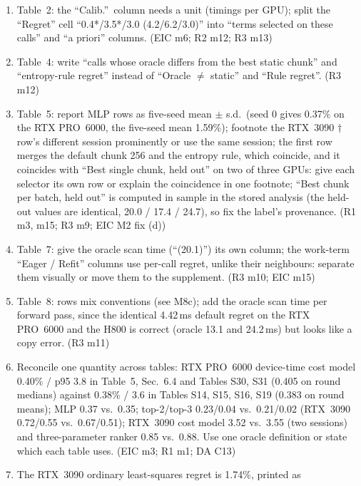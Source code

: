 \documentclass[11pt]{article}
\begin{document}
\begin{enumerate}[label=N\arabic*.]
        overlap the plotted lines. (R3 m8)
  \item Table~2: the ``Calib.''\ column needs a unit (timings per GPU); split
        the ``Regret'' cell ``0.4*/3.5*/3.0 (4.2/6.2/3.0)'' into ``terms
        selected on these calls'' and ``a priori'' columns. (EIC m6; R2 m12;
        R3 m13)
  \item Table~4: write ``calls whose oracle differs from the best static
        chunk'' and ``entropy-rule regret'' instead of ``Oracle $\neq$
        static'' and ``Rule regret''. (R3 m12)
  \item Table~5: report MLP rows as five-seed mean $\pm$ s.d.\ (seed 0 gives
        0.37\% on the RTX PRO~6000, the five-seed mean 1.59\%); footnote the
        RTX~3090 $\dagger$ row's different session prominently or use the
        same session; the first row merges the default chunk 256 and the
        entropy rule, which coincide, and it coincides with ``Best single
        chunk, held out'' on two of three GPUs: give each selector its own
        row or explain the coincidence in one footnote; ``Best chunk per
        batch, held out'' is computed in sample in the stored analysis (the
        held-out values are identical, 20.0 / 17.4 / 24.7), so fix the label's
        provenance. (R1 m3, m15; R3 m9; EIC M2 fix (d))
  \item Table~7: give the oracle scan time (``(20.1)'') its own column; the
        work-term ``Eager / Refit'' columns use per-call regret, unlike their
        neighbours: separate them visually or move them to the supplement.
        (R3 m10; EIC m15)
  \item Table~8: rows mix conventions (see M8c); add the oracle scan time per
        forward pass, since the identical 4.42\,ms default regret on the RTX
        PRO~6000 and the H800 is correct (oracle 13.1 and 24.2\,ms) but looks
        like a copy error. (R3 m11)
  \item Reconcile one quantity across tables: RTX PRO~6000 device-time cost
        model 0.40\% / p95 3.8 in Table~5, Sec.~6.4 and Tables S30, S31
        (0.405 on round medians) against 0.38\% / 3.6 in Tables S14, S15, S16,
        S19 (0.383 on round means); MLP 0.37 vs.\ 0.35; top-2/top-3 0.23/0.04
        vs.\ 0.21/0.02 (RTX~3090 0.72/0.55 vs.\ 0.67/0.51); RTX~3090 cost model
        3.52 vs.\ 3.55 (two sessions) and three-parameter ranker 0.85 vs.\
        0.88. Use one oracle definition or state which each table uses. (EIC
        m3; R1 m1; DA C13)
  \item The RTX~3090 ordinary least-squares regret is 1.74\%, printed as

\end{enumerate}
\end{document}
